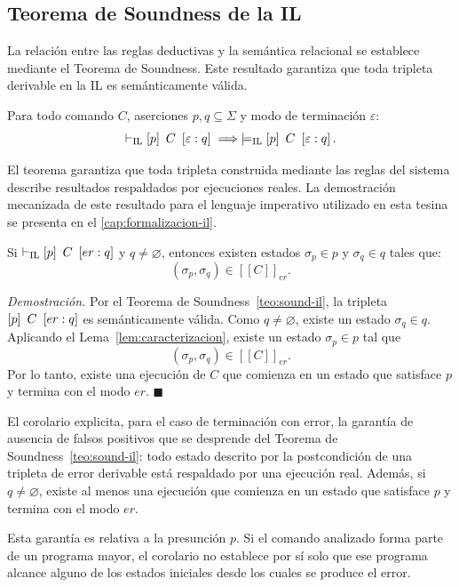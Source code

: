 \documentclass[a4paper,	11pt]{report}
\begin{document}
\subsection*{Teorema de Soundness de la IL}
La relación entre las reglas deductivas y la semántica relacional se establece mediante el Teorema de Soundness.
Este resultado garantiza que toda tripleta derivable en la IL es semánticamente válida.

\begin{teorema}
\label{teo:sound-il}
Para todo comando $C$, aserciones $p, q \subseteq \Sigma$ y modo de terminación $\varepsilon$:
$$\vdash_{\mathrm{IL}} \left\lbrack p \right\rbrack~C~\left\lbrack \varepsilon : q \right\rbrack \implies \models_{\mathrm{IL}} \left\lbrack p \right\rbrack~C~\left\lbrack \varepsilon : q \right\rbrack.$$
\end{teorema}

El teorema garantiza que toda tripleta construida mediante las reglas del sistema
describe resultados respaldados por ejecuciones reales.
La demostración mecanizada de este resultado para el lenguaje imperativo
utilizado en esta tesina se presenta en el \autoref{cap:formalizacion-il}.

\begin{corolario}
\label{cor:errores}
Si
$\vdash_{\mathrm{IL}} \left\lbrack p \right\rbrack~C~\left\lbrack er : q \right\rbrack$
y $q \neq \varnothing$,
entonces existen estados $\sigma_p \in p$ y $\sigma_q \in q$ tales que:
$$(\sigma_p, \sigma_q) \in [\![C]\!]_{er}.$$
\end{corolario}
\emph{Demostración.} Por el Teorema de Soundness~\ref{teo:sound-il},
la tripleta $\left\lbrack p \right\rbrack~C~\left\lbrack er : q \right\rbrack$ es semánticamente válida.
Como $q \neq \varnothing$,
existe un estado $\sigma_q \in q$.
Aplicando el Lema~\ref{lem:caracterizacion},
existe un estado $\sigma_p \in p$ tal que
$$(\sigma_p, \sigma_q) \in [\![C]\!]_{er}.$$
Por lo tanto,
existe una ejecución de $C$ que comienza en un estado que satisface $p$ y termina con el modo $er$.
$\ensuremath{\blacksquare}$

El corolario explicita,
para el caso de terminación con error,
la garantía de ausencia de falsos positivos que se desprende del Teorema de Soundness~\ref{teo:sound-il}:
todo estado descrito por la postcondición de una tripleta de error derivable
está respaldado por una ejecución real.
Además, si $q \neq \varnothing$,
existe al menos una ejecución que comienza en un estado que satisface $p$ y termina con el modo $er$.

Esta garantía es relativa a la presunción $p$.
Si el comando analizado forma parte de un programa mayor,
el corolario no establece por sí solo que ese programa alcance alguno de los estados iniciales desde los cuales se produce el error.
\end{document}
